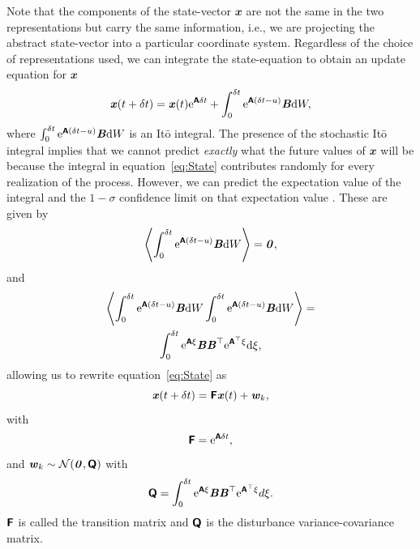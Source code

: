 \documentclass[a4paper,fleqn,usenatbib]{mnras}
\begin{document}
Note that the components of the state-vector $\mathbfit{x}$ are not the same in the two representations but carry the same information, i.e., we are projecting the abstract state-vector into a particular coordinate system. Regardless of the choice of representations used, we can integrate the state-equation \citep{DimensionEstimationBrockwell,Oksendal} to obtain an update equation for $\mathbfit{x}$
\begin{equation}\label{eq:State}
\textbf{\textit{x}}(t + \delta t) = \textbf{\textit{x}}(t)\mathrm{e}^{\textbf{\textsf{A}}\delta t} + \int_{0}^{\delta t} \mathrm{e}^{\textbf{\textsf{A}}(\delta t-u)}\textbf{\textit{B}} \mathrm{d}W,
\end{equation}
where $\int_{0}^{\delta t} \mathrm{e}^{\textbf{\textsf{A}}(\delta t-u)}\textbf{\textit{B}} \mathrm{d}W$ is an It\={o} integral. The presence of the stochastic It\={o} integral implies that we cannot predict \textit{exactly} what the future values of $\mathbfit{x}$ will be because the integral in equation~\eqref{eq:State} contributes randomly for every realization of the process. However, we can predict the expectation value of the integral and the $1-\sigma$ confidence limit on that expectation value \citep[chapter 6]{Davis}. These are given by
\begin{equation}\label{eq:ExpVal}
\left\langle \int_{0}^{\delta t} \mathrm{e}^{\textbf{\textsf{A}}(\delta t-u)}\textbf{\textit{B}} \mathrm{d}W \right\rangle = \textbf{\textit{0}},
\end{equation}
and
\begin{multline}\label{eq:CovVal}
\left\langle \int_{0}^{\delta t} \mathrm{e}^{\textbf{\textsf{A}}(\delta t-u)}\textbf{\textit{B}} \mathrm{d}W \int_{0}^{\delta t} \mathrm{e}^{\textbf{\textsf{A}}(\delta t-u)}\textbf{\textit{B}} \mathrm{d}W \right\rangle = \\ \int_{0}^{\delta t} \mathrm{e}^{\textbf{\textsf{A}}\xi}\textbf{\textit{B}}\textbf{\textit{B}}^{\top}\mathrm{e}^{\textbf{\textsf{A}}^{\top}\xi} \mathrm{d}\xi,
\end{multline}
allowing us to rewrite equation~\ref{eq:State} as
\begin{equation}\label{eq:IntegratedState}
\textbf{\textit{x}}(t + \delta t) = \textbf{\textsf{F}}\textbf{\textit{x}}(t) + \textbf{\textit{w}}_{k},
\end{equation}
with \begin{equation}\label{eq:TransMat}
\textbf{\textsf{F}} = \mathrm{e}^{\textbf{\textsf{A}}\delta t},
\end{equation}
and $\textbf{\textit{w}}_{k} \sim \mathcal{N}(\textbf{\textit{0}},\textbf{\textsf{Q}})$ with 
\begin{equation}\label{eq:DistMat}
\textbf{\textsf{Q}} = \int_{0}^{\delta t} \mathrm{e}^{\textbf{\textsf{A}}\xi}\textbf{\textit{B}}\textbf{\textit{B}}^{\top}\mathrm{e}^{\textbf{\textsf{A}}^{\top}\xi} d\xi.
\end{equation}
$\textbf{\textsf{F}}$ is called the transition matrix and $\textbf{\textsf{Q}}$ is the disturbance variance-covariance matrix.
\end{document}
